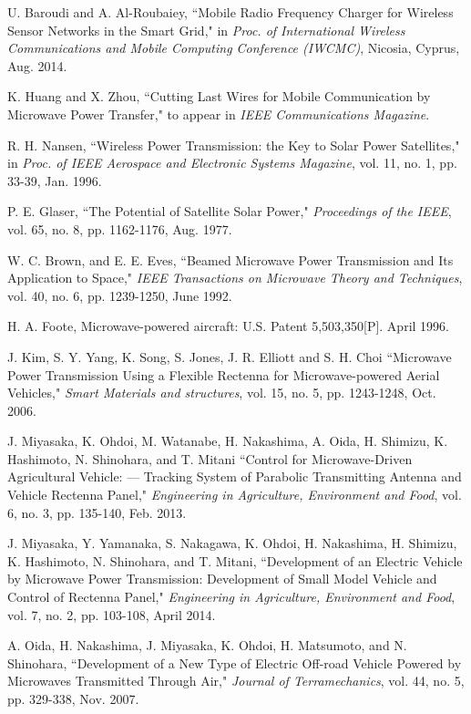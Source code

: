\documentclass[twocolumn,10pt]{IEEEtran}
\begin{document}
\begin{thebibliography}{99}
 U. Baroudi and A. Al-Roubaiey, ``Mobile Radio Frequency Charger for Wireless Sensor Networks in the Smart Grid," in \emph{Proc. of International Wireless Communications and Mobile Computing Conference (IWCMC)}, Nicosia, Cyprus, Aug. 2014. 
 
K. Huang and X. Zhou, ``Cutting Last Wires for Mobile Communication by Microwave Power Transfer," to appear in \emph{IEEE Communications Magazine}. 
 
R. H. Nansen, ``Wireless Power Transmission: the Key to Solar Power Satellites," in \emph{Proc. of IEEE Aerospace and Electronic Systems Magazine}, vol. 11, no. 1, pp. 33-39, Jan. 1996.	
 
P. E. Glaser, ``The Potential of Satellite Solar Power," \emph{Proceedings of the IEEE}, vol. 65, no. 8, pp. 1162-1176, Aug. 1977.

W. C. Brown, and E. E. Eves, ``Beamed Microwave Power Transmission and Its Application to Space," \emph{IEEE Transactions on Microwave Theory and Techniques}, vol. 40, no. 6, pp. 1239-1250, June 1992. 
 


H. A. Foote, Microwave-powered aircraft: U.S. Patent 5,503,350[P]. April 1996. 
 
J. Kim, S. Y. Yang, K. Song, S. Jones, J. R. Elliott and S. H. Choi   ``Microwave Power Transmission Using a Flexible Rectenna for Microwave-powered Aerial Vehicles," \emph{Smart Materials and structures}, vol. 15, no. 5, pp. 1243-1248, Oct. 2006.  
 
J. Miyasaka, K. Ohdoi, M. Watanabe, H. Nakashima, A. Oida, H. Shimizu, K. Hashimoto, N. Shinohara, and T. Mitani
``Control for Microwave-Driven Agricultural Vehicle: — Tracking System of Parabolic Transmitting Antenna and Vehicle Rectenna Panel," \emph{Engineering in Agriculture, Environment and Food}, vol. 6, no. 3, pp. 135-140, Feb. 2013.


J. Miyasaka, Y. Yamanaka, S. Nakagawa, K. Ohdoi, H. Nakashima, H. Shimizu, K. Hashimoto, N. Shinohara, and T. Mitani,
``Development of an Electric Vehicle by Microwave Power Transmission: Development of Small Model Vehicle and Control of Rectenna Panel," \emph{Engineering in Agriculture, Environment and Food}, vol. 7, no. 2, pp. 103-108, April 2014.

A. Oida, H. Nakashima, J. Miyasaka, K. Ohdoi, H. Matsumoto, and N. Shinohara, ``Development of a New Type of Electric Off-road Vehicle Powered by Microwaves Transmitted Through Air," \emph{Journal of Terramechanics}, vol. 44, no. 5, pp. 329-338, Nov. 2007. 


\end{thebibliography}
\end{document}

